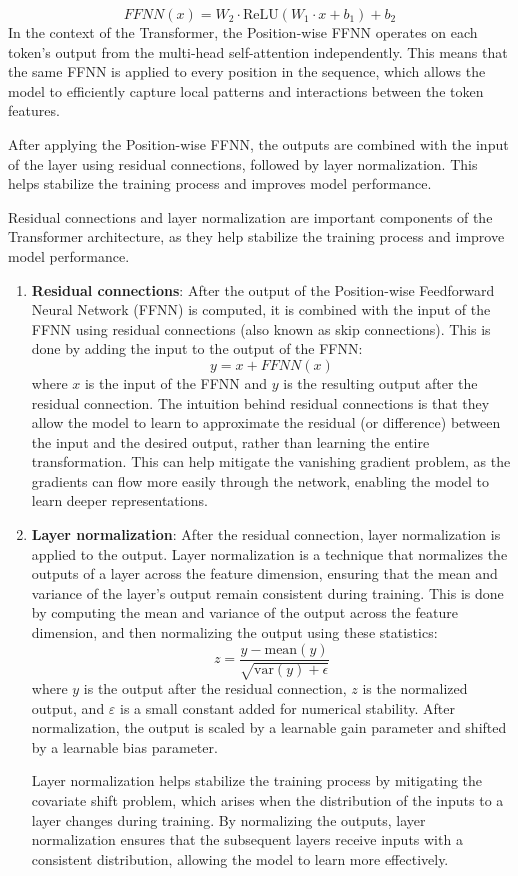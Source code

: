 \documentclass[12pt]{article}
\begin{document}
$$ FFNN(x) = W_2 \cdot \text{ReLU}(W_1 \cdot x + b_1) + b_2 $$
In the context of the Transformer, the Position-wise FFNN operates on each token's output from the multi-head self-attention independently. This means that the same FFNN is applied to every position in the sequence, which allows the model to efficiently capture local patterns and interactions between the token features.

After applying the Position-wise FFNN, the outputs are combined with the input of the layer using residual connections, followed by layer normalization. This helps stabilize the training process and improves model performance.

Residual connections and layer normalization are important components of the Transformer architecture, as they help stabilize the training process and improve model performance.

\begin{enumerate}
	\item {\textbf{Residual connections}: After the output of the Position-wise Feedforward Neural Network (FFNN) is computed, it is combined with the input of the FFNN using residual connections (also known as skip connections). This is done by adding the input to the output of the FFNN:
	$$y = x + FFNN(x) $$
	where $x$ is the input of the FFNN and $y$ is the resulting output after the residual connection. The intuition behind residual connections is that they allow the model to learn to approximate the residual (or difference) between the input and the desired output, rather than learning the entire transformation. This can help mitigate the vanishing gradient problem, as the gradients can flow more easily through the network, enabling the model to learn deeper representations.
	}
	\item {\textbf{Layer normalization}: After the residual connection, layer normalization is applied to the output. Layer normalization is a technique that normalizes the outputs of a layer across the feature dimension, ensuring that the mean and variance of the layer's output remain consistent during training. This is done by computing the mean and variance of the output across the feature dimension, and then normalizing the output using these statistics:
$$z = \frac{y - \text{mean}(y)}{\sqrt{\text{var}(y) + \epsilon}}$$
where $y$ is the output after the residual connection, $z$ is the normalized output, and $\varepsilon$ is a small constant added for numerical stability. After normalization, the output is scaled by a learnable gain parameter and shifted by a learnable bias parameter.

Layer normalization helps stabilize the training process by mitigating the covariate shift problem, which arises when the distribution of the inputs to a layer changes during training. By normalizing the outputs, layer normalization ensures that the subsequent layers receive inputs with a consistent distribution, allowing the model to learn more effectively.}
\end{enumerate}
\end{document}
